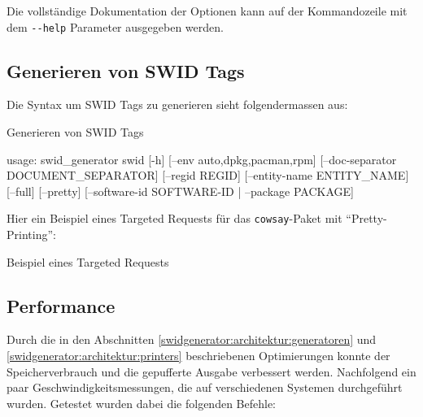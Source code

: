 Die vollständige Dokumentation der Optionen kann auf der Kommandozeile mit dem
\texttt{-{}-help} Parameter ausgegeben werden.


\subsection{Generieren von SWID Tags}

Die Syntax um SWID Tags zu generieren sieht folgendermassen aus:

\begin{listing}[H]
\caption{Generieren von SWID Tags}
\begin{textcode}
usage: swid_generator swid [-h] [--env {auto,dpkg,pacman,rpm}]
                           [--doc-separator DOCUMENT_SEPARATOR]
                           [--regid REGID] [--entity-name ENTITY_NAME]
                           [--full] [--pretty]
                           [--software-id SOFTWARE-ID | --package PACKAGE]
\end{textcode}
\end{listing}

Hier ein Beispiel eines Targeted Requests für das \texttt{cowsay}-Paket mit
\enquote{Pretty-Printing}:

\begin{listing}[H]
\caption{Beispiel eines Targeted Requests}
\end{listing}


\subsection{Performance}

Durch die in den Abschnitten \ref{swidgenerator:architektur:generatoren} und
\ref{swidgenerator:architektur:printers} beschriebenen Optimierungen konnte der
Speicherverbrauch und die gepufferte Ausgabe verbessert werden.
Nachfolgend ein paar Geschwindigkeitsmessungen, die auf verschiedenen Systemen
durchgeführt wurden. Getestet wurden dabei die folgenden Befehle:

